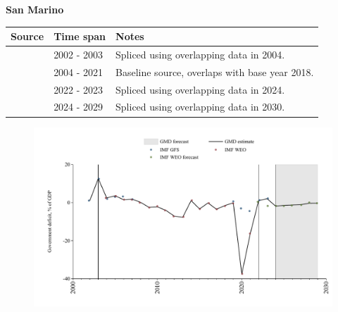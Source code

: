 \documentclass[12pt,a4paper,landscape]{article}
\begin{document}
\begin{adjustbox}{max totalsize={\paperwidth}{\paperheight},center}
\begin{minipage}[t][\textheight][t]{\textwidth}
\vspace*{0.5cm}
{}
\begin{center}
{\Large\bfseries San Marino}
\end{center}
\vspace{0.5cm}
\begin{table}[H]
\centering
\small
\begin{tabular}{|l|l|l|}
\hline
\textbf{Source} & \textbf{Time span} & \textbf{Notes} \\
\hline
\rowcolor{white}\cite{IMF_GFS}& 2002 - 2003 &Spliced using overlapping data in 2004.\\
\rowcolor{lightgray}\cite{IMF_WEO}& 2004 - 2021 &Baseline source, overlaps with base year 2018.\\
\rowcolor{white}\cite{IMF_GFS}& 2022 - 2023 &Spliced using overlapping data in 2024.\\
\rowcolor{lightgray}\cite{IMF_WEO_forecast}& 2024 - 2029 &Spliced using overlapping data in 2030.\\
\hline
\end{tabular}
\end{table}
\begin{figure}[H]
\centering
\includegraphics[width=\textwidth,height=0.6\textheight,keepaspectratio]{graphs/SMR_govdef_GDP.pdf}
\end{figure}
\end{minipage}
\end{adjustbox}
\end{document}
